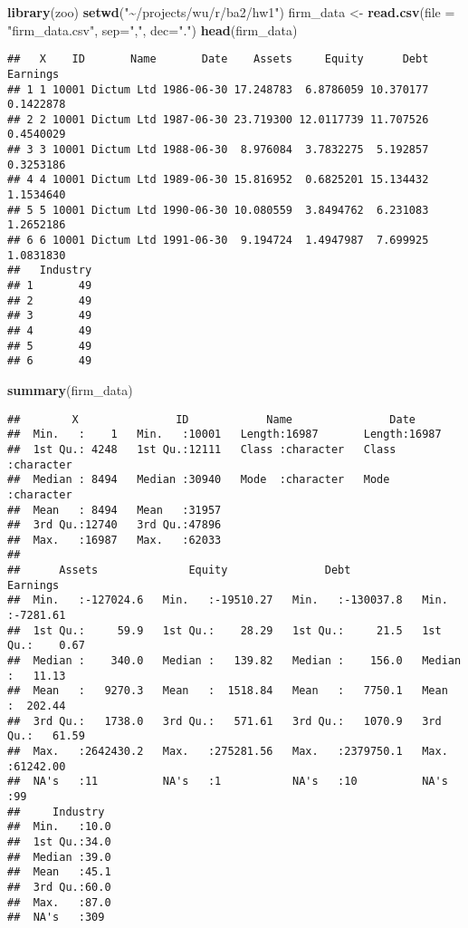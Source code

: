 \documentclass[
]{article}
\newenvironment{Shaded}{\begin{snugshade}}{\end{snugshade}}
\newcommand{\AttributeTok}[1]{\textcolor[rgb]{0.13,0.29,0.53}{#1}}
\newcommand{\FunctionTok}[1]{\textcolor[rgb]{0.13,0.29,0.53}{\textbf{#1}}}
\newcommand{\NormalTok}[1]{#1}
\newcommand{\OtherTok}[1]{\textcolor[rgb]{0.56,0.35,0.01}{#1}}
\newcommand{\StringTok}[1]{\textcolor[rgb]{0.31,0.60,0.02}{#1}}
\begin{document}
\begin{Shaded}
\begin{Highlighting}[]
\FunctionTok{library}\NormalTok{(zoo)}
\FunctionTok{setwd}\NormalTok{(}\StringTok{"\textasciitilde{}/projects/wu/r/ba2/hw1"}\NormalTok{)}
\NormalTok{firm\_data }\OtherTok{\textless{}{-}} \FunctionTok{read.csv}\NormalTok{(}\AttributeTok{file =} \StringTok{"firm\_data.csv"}\NormalTok{, }\AttributeTok{sep=}\StringTok{","}\NormalTok{, }\AttributeTok{dec=}\StringTok{"."}\NormalTok{)}
\FunctionTok{head}\NormalTok{(firm\_data)}
\end{Highlighting}
\end{Shaded}

\begin{verbatim}
##   X    ID       Name       Date    Assets     Equity      Debt  Earnings
## 1 1 10001 Dictum Ltd 1986-06-30 17.248783  6.8786059 10.370177 0.1422878
## 2 2 10001 Dictum Ltd 1987-06-30 23.719300 12.0117739 11.707526 0.4540029
## 3 3 10001 Dictum Ltd 1988-06-30  8.976084  3.7832275  5.192857 0.3253186
## 4 4 10001 Dictum Ltd 1989-06-30 15.816952  0.6825201 15.134432 1.1534640
## 5 5 10001 Dictum Ltd 1990-06-30 10.080559  3.8494762  6.231083 1.2652186
## 6 6 10001 Dictum Ltd 1991-06-30  9.194724  1.4947987  7.699925 1.0831830
##   Industry
## 1       49
## 2       49
## 3       49
## 4       49
## 5       49
## 6       49
\end{verbatim}

\begin{Shaded}
\begin{Highlighting}[]
\FunctionTok{summary}\NormalTok{(firm\_data)}
\end{Highlighting}
\end{Shaded}

\begin{verbatim}
##        X               ID            Name               Date          
##  Min.   :    1   Min.   :10001   Length:16987       Length:16987      
##  1st Qu.: 4248   1st Qu.:12111   Class :character   Class :character  
##  Median : 8494   Median :30940   Mode  :character   Mode  :character  
##  Mean   : 8494   Mean   :31957                                        
##  3rd Qu.:12740   3rd Qu.:47896                                        
##  Max.   :16987   Max.   :62033                                        
##                                                                       
##      Assets              Equity               Debt              Earnings       
##  Min.   :-127024.6   Min.   :-19510.27   Min.   :-130037.8   Min.   :-7281.61  
##  1st Qu.:     59.9   1st Qu.:    28.29   1st Qu.:     21.5   1st Qu.:    0.67  
##  Median :    340.0   Median :   139.82   Median :    156.0   Median :   11.13  
##  Mean   :   9270.3   Mean   :  1518.84   Mean   :   7750.1   Mean   :  202.44  
##  3rd Qu.:   1738.0   3rd Qu.:   571.61   3rd Qu.:   1070.9   3rd Qu.:   61.59  
##  Max.   :2642430.2   Max.   :275281.56   Max.   :2379750.1   Max.   :61242.00  
##  NA's   :11          NA's   :1           NA's   :10          NA's   :99        
##     Industry   
##  Min.   :10.0  
##  1st Qu.:34.0  
##  Median :39.0  
##  Mean   :45.1  
##  3rd Qu.:60.0  
##  Max.   :87.0  
##  NA's   :309
\end{verbatim}
\end{document}
